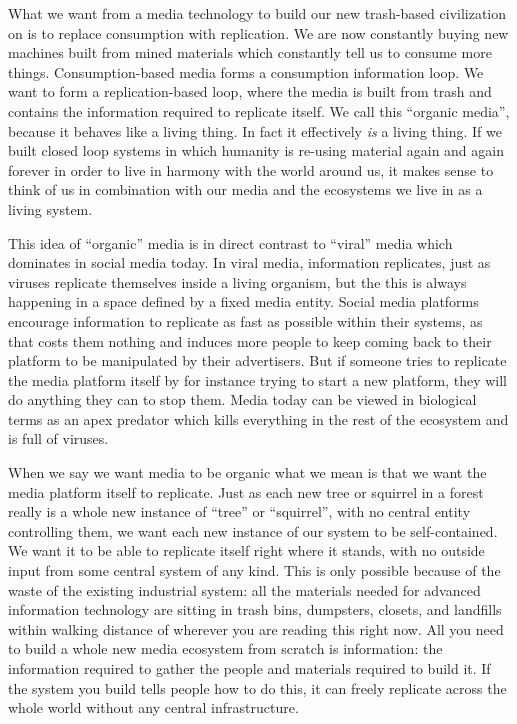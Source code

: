 What we want from a media technology to build  our new trash-based civilization on is to replace consumption with replication.  We are now constantly buying new machines built from mined materials which constantly tell us to consume more things.  Consumption-based media forms a consumption information loop.  We want to form a replication-based loop, where the media is built from trash and contains the information required to replicate itself.  We call this ``organic media'', because it behaves like a living thing.  In fact it effectively \emph{is} a living thing.  If we built closed loop systems in which humanity is re-using material again and again forever in order to live in harmony with the world around us, it makes sense to think of us in combination with our media and the ecosystems we live in as a living system.  

This idea of ``organic'' media is in direct contrast to ``viral'' media which dominates in social media today.  In viral media, information replicates, just as viruses replicate themselves inside a living organism, but the this is always happening in a space defined by a fixed media entity.  Social media platforms encourage information to replicate as fast as possible within their systems, as that costs them nothing and induces more people to keep coming back to their platform to be manipulated by their advertisers.  But if someone tries to replicate the media platform itself by for instance trying to start a new platform, they will do anything they can to stop them.  Media today can be viewed in biological terms as an apex predator which kills everything in the rest of the ecosystem and is full of viruses.  

When we say we want media to be organic what we mean is that we want the media platform itself to replicate.  Just as each new tree or squirrel in a forest really is a whole new instance of ``tree'' or ``squirrel'', with no central entity controlling them, we want each new instance of our system to be self-contained.  We want it to be able to replicate itself right where it stands, with no outside input from some central system of any kind.  This is only possible because of the waste of the existing industrial system: all the materials needed for advanced information technology are sitting in trash bins, dumpsters, closets, and landfills within walking distance of wherever you are reading this right now.  All you need to build a whole new media ecosystem from scratch is information: the information required to gather the people and materials required to build it.  If the system you build tells people how to do this, it can freely replicate across the whole world without any central infrastructure.  

